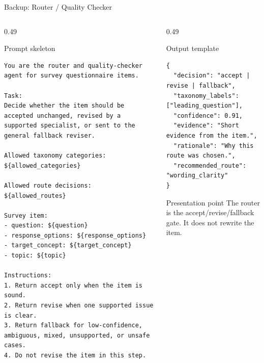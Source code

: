 \documentclass[aspectratio=169]{beamer}
\begin{document}
\begin{frame}[fragile]{Backup: Router / Quality Checker}
  \begin{columns}[T]
    \begin{column}{0.49\textwidth}
      \begin{block}{Prompt skeleton}
\begin{lstlisting}
You are the router and quality-checker agent for survey questionnaire items.

Task:
Decide whether the item should be accepted unchanged, revised by a supported specialist, or sent to the general fallback reviser.

Allowed taxonomy categories:
${allowed_categories}

Allowed route decisions:
${allowed_routes}

Survey item:
- question: ${question}
- response_options: ${response_options}
- target_concept: ${target_concept}
- topic: ${topic}

Instructions:
1. Return accept only when the item is sound.
2. Return revise when one supported issue is clear.
3. Return fallback for low-confidence, ambiguous, mixed, unsupported, or unsafe cases.
4. Do not revise the item in this step.
\end{lstlisting}
      \end{block}
    \end{column}
    \begin{column}{0.49\textwidth}
      \begin{block}{Output template}
\begin{lstlisting}
{
  "decision": "accept | revise | fallback",
  "taxonomy_labels": ["leading_question"],
  "confidence": 0.91,
  "evidence": "Short evidence from the item.",
  "rationale": "Why this route was chosen.",
  "recommended_route": "wording_clarity"
}
\end{lstlisting}
      \end{block}

      \begin{alertblock}{Presentation point}
        The router is the accept/revise/fallback gate. It does not rewrite the item.
      \end{alertblock}
    \end{column}
  \end{columns}
\end{frame}
\end{document}
